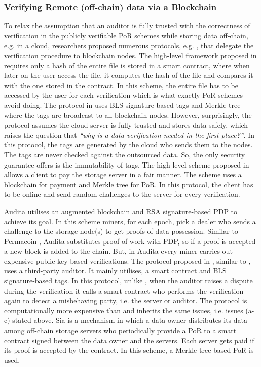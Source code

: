  \subsubsection{Verifying Remote (off-chain) data via a Blockchain}
 To relax the assumption that an auditor is fully trusted with the correctness of verification in the publicly verifiable PoR schemes while storing data off-chain, e.g. in a cloud, researchers proposed numerous protocols, e.g. \cite{RennerMK18,HaoXWJW18,ZhangDLZ18,Audita18,blockchain-data-audit-18,sia14}, that delegate the verification procedure  to blockchain nodes.  The high-level framework  proposed in \cite{RennerMK18} requires only a hash of the entire file is stored in a smart contract, where when later on the user access the file, it computes the hash of the file and compares it with the one stored in the contract. In this scheme, the entire file has to be accessed by the user for each verification which is what exactly PoR schemes avoid doing. The protocol  in \cite{HaoXWJW18} uses BLS signature-based tags and Merkle tree where the tags are broadcast to all blockchain nodes. However, surprisingly, the protocol assumes the cloud server is fully trusted and stores data safely, which raises the question that \textit{``why is a data verification needed in the first place?''}. In this protocol, the tags are generated by the cloud who sends them to the nodes. The tags are never checked against the outsourced data.  So, the only security guarantee \cite{HaoXWJW18} offers is the immutability of tags. The high-level scheme proposed in \cite{ZhangDLZ18} allows a client to pay the storage server in a fair manner. The scheme uses a blockchain for payment    and Merkle tree for PoR. In this protocol, the client has to be online and send random challenges to the server for every verification. 
 
 Audita  \cite{Audita18} utilises an augmented blockchain and RSA signature-based  PDP  \cite{DBLP:conf/ccs/AtenieseBCHKPS07} to achieve its goal. In this scheme miners, for each epoch, pick a dealer who sends a challenge to the storage node(s) to get  proofs of data possession. Similar to Permacoin \cite{MillerPermacoin}, Audita substitutes proof of work with PDP, so if a proof is accepted a new block is added to the chain. But, in Audita every miner carries out  expensive public key based verifications.  The protocol proposed in \cite{blockchain-data-audit-18},   similar to \cite{armknecht2014outsourced}, uses a third-party auditor. It mainly utilises, a smart contract and  BLS signature-based tags. In this protocol, unlike \cite{armknecht2014outsourced},  when the auditor raises a dispute during the verification it calls a smart contract who performs the verification again to detect a misbehaving party, i.e. the server or auditor.  The protocol is computationally more expensive than \cite{armknecht2014outsourced} and inherits the same  issues, i.e. issues (a-c) stated above.  Sia \cite{sia14} is a mechanism in which a data owner  distributes  its data among off-chain storage servers who periodically provide a PoR  to a smart contract signed between the data owner and the servers. Each server gets paid if its proof is accepted by the contract. In this scheme, a Merkle tree-based PoR is used. 
 
